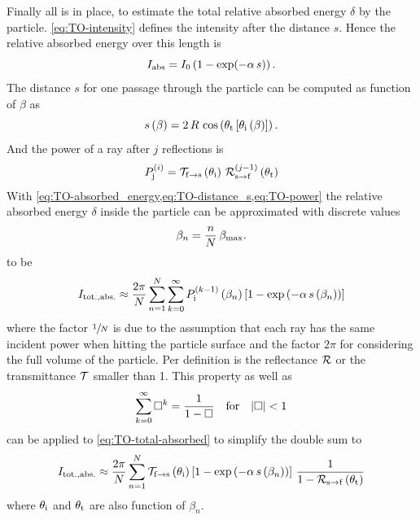Finally all is in place, to estimate the total relative absorbed energy 
$\delta$ by the particle.  \cref{eq:TO-intensity} defines the intensity after 
the distance $s$. Hence the relative absorbed energy over this length is
\begin{equation}
    I_{\mathrm{abs}} = I_{0} \left( 1 - \exp(-\alpha\,s) \right).
    \label{eq:TO-absorbed_energy}
\end{equation}
The distance $s$ for one passage through the particle can be computed as 
function of $\beta$ as
\begin{equation}
  s\left( \beta \right) = 2\,R\,\cos\left( \theta_{\mathrm{t}}\left[ \theta_{\mathrm{i}}\left( 
    \beta \right) \right]
    \right).
    \label{eq:TO-distance_s}
\end{equation}
And the power of a ray after $j$ reflections is
\begin{equation}
  P_{\mathrm{j}}^{(i)} =
  \mathcal{T}_{\mathrm{f}\rightarrow\mathrm{s}}\left( \theta_{\mathrm{i}} \right) \,
  \mathcal{R}^{(j-1)}_{\mathrm{s}\rightarrow\mathrm{f}}\left( \theta_{\mathrm{t}} \right)
  \label{eq:TO-power}
\end{equation}
With \cref{eq:TO-absorbed_energy,eq:TO-distance_s,eq:TO-power} the relative 
absorbed energy $\delta$ inside the particle can be approximated with discrete 
values
\begin{equation}
  \beta_{n} = \frac{n}{N}\,\beta_{\mathrm{max}}.
  \label{eq:TO-beta-disc}
\end{equation}
to be
\begin{equation}
  I_{\mathrm{tot.,abs.}} \approx
  \frac{2\pi}{N}
  \sum\limits_{n=1}^{N}
  \sum\limits_{k=0}^{\infty}P_{\mathrm{i}}^{(k-1)}\left( \beta_{n} \right)\left[ 1 - 
  \exp\left( -\alpha\,s\left( \beta_{n} \right) \right) \right]
  \label{eq:TO-total-absorbed}
\end{equation}
where the factor $\sfrac{1}{N}$ is due to the assumption that each ray has the 
same incident power when hitting the particle surface and the factor $2\pi$ for 
considering the full volume of the particle. Per definition is the reflectance 
$\mathcal{R}$ or the transmittance $\mathcal{T}$ smaller than 1. This property as 
well as
\begin{equation}
  \sum\limits^{\infty}_{k=0} \Box^{k} = \frac{1}{1-\Box}
  \quad\text{for}\quad\abs{\Box} < 1
\end{equation}
can be applied to \cref{eq:TO-total-absorbed} to simplify the double sum to
\begin{equation}
  I_{\mathrm{tot.,abs.}} \approx
  \frac{2\pi}{N}
  \sum\limits_{n=1}^{N}
  \mathcal{T}_{\mathrm{f}\rightarrow\mathrm{s}}\left( \theta_{\mathrm{i}} \right)
  \left[ 1 - \exp\left( -\alpha\,s\left( \beta_{n} \right) \right) \right]
\,\frac{1}{1-\mathcal{R}_{\mathrm{s}\rightarrow\mathrm{f}}\left( \theta_{\mathrm{t}} \right)}
  \label{eq:TO-total-absorbed-simp}
\end{equation}
where $\theta_{\mathrm{i}}$ and $\theta_{\mathrm{t}}$ are also function of $\beta_{n}$.

